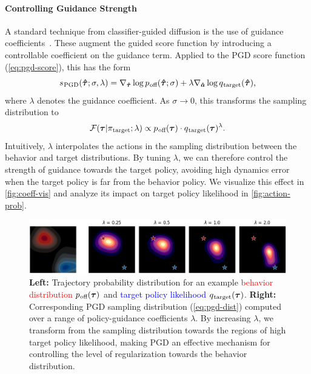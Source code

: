 \documentclass[10pt]{article} %
\theoremstyle{plain}
\theoremstyle{definition}
\theoremstyle{remark}
\newcommand{\qtarg}{q_{\mkern1mu\text{target}}}
\newcommand{\poff}{p_{\mkern1mu\text{off}}}
\begin{document}
\paragraph{Controlling Guidance Strength}
A standard technique from classifier-guided diffusion is the use of guidance coefficients~\citep{dhariwal2021diffusion}.
These augment the guided score function by introducing a controllable coefficient on the guidance term. Applied to the PGD score function (\autoref{eq:pgd-score}), this has the form
\begin{equation}
    s_{\mkern 1mu \text{PGD}}(\bm{\hat{\tau}};\sigma, \lambda) = \nabla_{\bm{\hat{\tau}}}\log \poff(\bm{\hat{\tau}};\sigma) + \lambda \nabla_{\bm{\hat{a}}} \log \qtarg(\bm{\hat{\tau}}) \text{,}
\end{equation}
where $\lambda$ denotes the guidance coefficient. As $\sigma \to 0$, this transforms the sampling distribution to
\begin{equation}
    \mathcal{F}(\bm{\tau} | \pi_{\text{target}};\lambda) \propto \poff(\bm{\tau}) \cdot \qtarg(\bm{\tau})^{\lambda} \text{.}
    \label{eq:pgd-dist}
\end{equation}
Intuitively, $\lambda$ interpolates the actions in the sampling distribution between the behavior and target distributions.
By tuning $\lambda$, we can therefore control the strength of guidance towards the target policy, avoiding high dynamics error when the target policy is far from the behavior policy.
We visualize this effect in \autoref{fig:coeff-vis} and analyze its impact on target policy likelihood in \autoref{fig:action-prob}.



\begin{figure}[t]
\centering
\vspace{-2mm}
\includegraphics[width=\textwidth]{figs/coeffs.png}
\vspace{-2mm}
\caption{
\textbf{Left:} Trajectory probability distribution for an example \textcolor{red}{behavior distribution $\poff(\bm{\tau})$} and \textcolor{blue}{target policy likelihood $\qtarg(\bm{\tau})$}.
\textbf{Right:} Corresponding PGD sampling distribution (\autoref{eq:pgd-dist}) computed over a range of policy-guidance coefficients $\lambda$.
By increasing $\lambda$, we transform from the sampling distribution towards the regions of high target policy likelihood, making PGD an effective mechanism for controlling the level of regularization towards the behavior distribution.
}
\label{fig:coeff-vis}
\end{figure}
\end{document}
